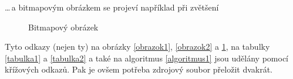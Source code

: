 \documentclass[11pt,a4paper,titlepage]{article}
\begin{document}
	\noindent\dots\,a bitmapovým obrázkem se projeví například při zvětšení

	\begin{figure}[h]
		\begin{center}
			\caption{Bitmapový obrázek}
		\label{obrazok3}
		\end{center}
	\end{figure}

	\noindent Tyto odkazy (nejen ty) na obrázky \ref{obrazok1}, \ref{obrazok2} a \ref{obrazok3}, na  
	tabulky \ref{tabulka1} a \ref{tabulka2} a také na algoritmus \ref{algoritmus1} jsou udělány pomocí 
	křížových odkazů. Pak je ovšem potřeba zdrojový soubor přeložit dvakrát.
\end{document}
